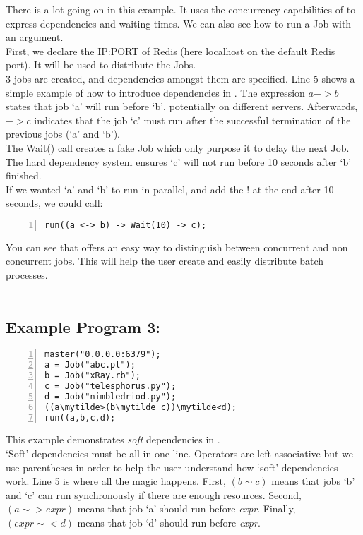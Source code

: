 There is a lot going on in this example. It uses the concurrency capabilities
of \lang{} to express dependencies and
waiting times. We can also see how to run a Job with an argument.\\
First, we declare the IP:PORT of Redis (here localhost on the default Redis
port). It will be used to
distribute the Jobs.\\
3 jobs are created, and dependencies amongst them are specified.
Line 5 shows a simple example of how to introduce dependencies in \lang{}.
The expression $a -> b$ states that job `a' will run before `b', potentially
on different servers. Afterwards,  $-> c$ indicates that the job `c' must run
after the
successful termination of the previous jobs (`a' and `b').\\
The Wait() call creates a fake Job which only purpose it to delay the next Job.
The hard dependency system
ensures `c' will not run before 10 seconds after `b' finished.\\
If we wanted `a' and `b' to run in parallel, and add the ! at the end after 10
seconds, we could call:
\begin{Verbatim}[numbers=left]
run((a <-> b) -> Wait(10) -> c);
\end{Verbatim}

You can see that \lang{} offers an easy way to distinguish between
concurrent and non concurrent jobs. This will help the user create and easily
distribute batch processes.\\
\\

\subsection*{Example Program 3:}
\begin{Verbatim}[numbers=left,commandchars=\\\{\}]
master("0.0.0.0:6379");
a = Job("abc.pl");
b = Job("xRay.rb");
c = Job("telesphorus.py");
d = Job("nimbledriod.py");
((a\mytilde>(b\mytilde c))\mytilde<d);
run((a,b,c,d);
\end{Verbatim}

This example demonstrates {\em soft} dependencies in \lang{}.\\
`Soft' dependencies must be all in one line. Operators
are left associative but we use parentheses in order to help
the user understand how `soft' dependencies work. Line 5 is where all the
magic happens. First, $(b\sim c)$ means that jobs `b' and `c' can run 
synchronously if there are enough resources. Second,
$(a\sim>expr)$ means that job `a' should run before \textit{expr}. 
Finally, $(expr\sim<d)$ means that job `d' should run before \textit{expr}.\\
\\

